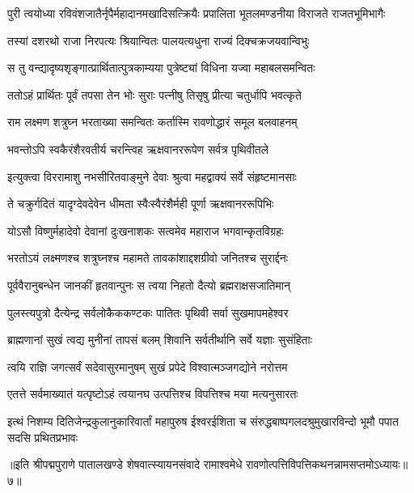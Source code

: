 \twolineshloka
{पुरी त्वयोध्या रविवंशजातैर्नृपैर्महादानमखादिसत्क्रियैः}
{प्रपालिता भूतलमण्डनीया विराजते राजतभूमिभागैः}%

\twolineshloka
{तस्यां दशरथो राजा निरपत्यः श्रियान्वितः}
{पालयत्यधुना राज्यं दिक्चक्रजयवान्विभुः}%

\twolineshloka
{स तु वन्द्यादृष्यशृङ्गात्प्रार्थितात्पुत्रकाम्यया}
{पुत्रेष्ट्यां विधिना यज्वा महाबलसमन्वितः}%

\twolineshloka
{ततोऽहं प्रार्थितः पूर्वं तपसा तेन भोः सुराः}
{पत्नीषु तिसृषु प्रीत्या चतुर्धापि भवत्कृते}%

\twolineshloka
{राम लक्ष्मण शत्रुघ्न भरताख्या समन्वितः}
{कर्तास्मि रावणोद्धारं समूल बलवाहनम्}%

\twolineshloka
{भवन्तोऽपि स्वकैरंशैरवतीर्य चरन्त्विह}
{ऋक्षवानररूपेण सर्वत्र पृथिवीतले}%

\twolineshloka
{इत्युक्त्वा विररामाशु नभसीरितवाङ्मुने}
{देवाः श्रुत्वा महद्वाक्यं सर्वे संहृष्टमानसाः}%

\twolineshloka
{ते चक्रुर्गदितं यादृग्देवदेवेन धीमता}
{स्वैःस्वैरंशैर्मही पूर्णा ऋक्षवानररूपिभिः}%

\twolineshloka
{योऽसौ विष्णुर्महादेवो देवानां दुःखनाशकः}
{सत्वमेव महाराज भगवान्कृतविग्रहः}%

\twolineshloka
{भरतोऽयं लक्ष्मणश्च शत्रुघ्नश्च महामते}
{तावकांशाद्दशग्रीवो जनितश्च सुरार्द्दनः}%

\twolineshloka
{पूर्ववैरानुबन्धेन जानकीं हृतवान्पुनः}
{स त्वया निहतो दैत्यो ब्रह्मराक्षसजातिमान्}%

\twolineshloka
{पुलस्त्यपुत्रो दैत्येन्द्र सर्वलोकैककण्टकः}
{पातितः पृथिवी सर्वा सुखमापमहेश्वर}%

\twolineshloka
{ब्राह्मणानां सुखं त्वद्य मुनीनां तापसं बलम्}
{शिवानि सर्वतीर्थानि सर्वे यज्ञाः सुसंहिताः}%

\twolineshloka
{त्वयि राज्ञि जगत्सर्वं सदेवासुरमानुषम्}
{सुखं प्रपेदे विश्वात्मञ्जगद्योने नरोत्तम}%

\twolineshloka
{एतत्ते सर्वमाख्यातं यत्पृष्टोऽहं त्वयानघ}
{उत्पत्तिश्च विपत्तिश्च मया मत्यनुसारतः}%

\twolineshloka
{इत्थं निशम्य दितिजेन्द्रकुलानुकारिवार्तां महापुरुष ईश्वरईशिता च}
{संरुद्धबाष्पगलदश्रुमुखारविन्दो भूमौ पपात सदसि प्रथितप्रभावः}%

{॥इति श्रीपद्मपुराणे पातालखण्डे शेषवात्स्यायनसंवादे रामाश्वमेधे रावणोत्पत्तिविपत्तिकथनन्नामसप्तमोऽध्यायः॥७॥}

\resetShloka


